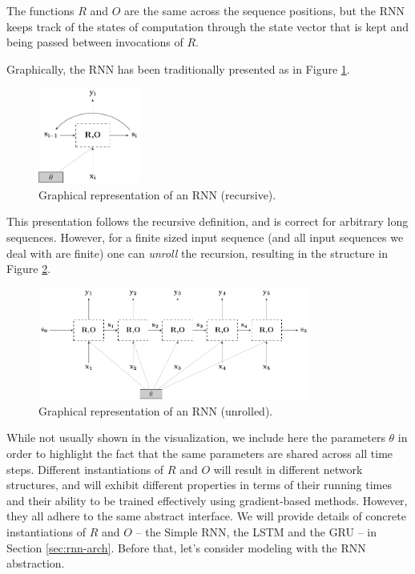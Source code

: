 \documentclass[jair,twoside,11pt,theapa]{article}
\begin{document}
{The functions $R$ and $O$ are the same across the sequence positions, but the
RNN keeps track of the states of computation through the state vector that is
kept and being passed between invocations of $R$.

Graphically, the RNN has been traditionally presented as in Figure
\ref{fig:rnn-rec}.

\begin{figure}[h!]
\begin{center}
\includegraphics[width=0.3\textwidth]{rnn-cycle.pdf}
\end{center}
\caption{Graphical representation of an RNN (recursive).}
\label{fig:rnn-rec}
\end{figure}

\noindent This presentation follows the recursive definition, and is correct for
arbitrary long sequences. However, for a finite sized input sequence (and all
input sequences we deal with are finite) one can \emph{unroll} the recursion,
resulting in the structure in Figure \ref{fig:unrolled-rnn}.

\begin{figure}[h!]
\begin{center}
\includegraphics[width=0.8\textwidth]{rnn-unrolled.pdf}
\caption{Graphical representation of an RNN (unrolled).}
\label{fig:unrolled-rnn}
\end{center}
\end{figure}

\noindent While not usually shown in the visualization, we include here the parameters $\theta$
in order to highlight the fact that the same parameters are shared across all time steps.
Different instantiations of $R$ and $O$ will result in different network
structures, and will exhibit different properties in terms of their running
times and their ability to be trained effectively using gradient-based methods.
However, they all adhere to the same abstract interface. We will provide details
of concrete instantiations of $R$ and $O$ -- the Simple RNN, the LSTM and the
GRU -- in Section \ref{sec:rnn-arch}. 
Before that, let's consider modeling with the RNN abstraction.

}
\end{document}
